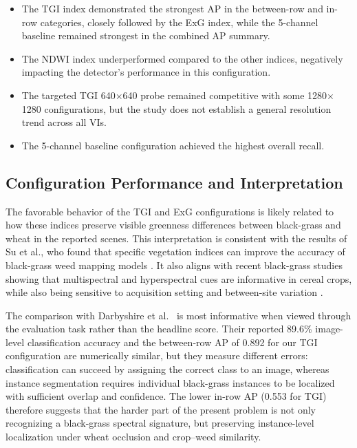 \documentclass{ieeeaccess}
\begin{document}
\begin{itemize}
    \item The TGI index demonstrated the strongest AP in the between-row and in-row categories, closely followed by the ExG index, while the 5-channel baseline remained strongest in the combined AP summary.
    \item The NDWI index underperformed compared to the other indices, negatively impacting the detector's performance in this configuration.
    \item The targeted TGI 640$\times$640 probe remained competitive with some 1280$\times$1280 configurations, but the study does not establish a general resolution trend across all VIs.
    \item The 5-channel baseline configuration achieved the highest overall recall.
\end{itemize}

\subsection{Configuration Performance and Interpretation}
The favorable behavior of the TGI and ExG configurations is likely related to how these indices preserve visible greenness differences between black-grass and wheat in the reported scenes. This interpretation is consistent with the results of Su et al., who found that specific vegetation indices can improve the accuracy of black-grass weed mapping models \cite{su_spectral_2022}. It also aligns with recent black-grass studies showing that multispectral and hyperspectral cues are informative in cereal crops, while also being sensitive to acquisition setting and between-site variation \cite{cox_black-grass_2023, goodsell_black_grass_2024, darbyshire_blackgrass_2025}.

The comparison with Darbyshire et al.~\cite{darbyshire_blackgrass_2025} is most informative when viewed through the evaluation task rather than the headline score. Their reported 89.6\% image-level classification accuracy and the between-row AP of 0.892 for our TGI configuration are numerically similar, but they measure different errors: classification can succeed by assigning the correct class to an image, whereas instance segmentation requires individual black-grass instances to be localized with sufficient overlap and confidence. The lower in-row AP (0.553 for TGI) therefore suggests that the harder part of the present problem is not only recognizing a black-grass spectral signature, but preserving instance-level localization under wheat occlusion and crop--weed similarity.
\end{document}
